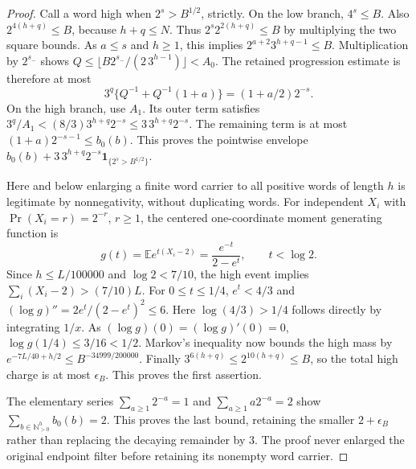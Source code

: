 \documentclass[11pt]{article}
\theoremstyle{remark}\newtheorem{remark}[proposition]{Remark}
\begin{document}
\begin{proof}
Call a word high when $2^s>B^{1/2}$, strictly. On the low branch,
$4^s\le B$. Also $2^{4(h+q)}\le B$, because $h+q\le N$.
Thus $2^s2^{2(h+q)}\le B$ by multiplying the two square bounds.
As $a\le s$ and $h\ge1$, this implies
$2^{a+2}3^{h+q-1}\le B$. Multiplication by $2^{s_-}$ shows
$Q\le\lfloor B2^{s_-}/(2\,3^{h-1})\rfloor<A_0$.
The retained progression estimate is therefore at most
\[
 3^q\{Q^{-1}+Q^{-1}(1+a)\}=(1+a/2)2^{-s}.
\]
On the high branch, use $A_1$. Its outer term satisfies
$3^q/A_1<(8/3)3^{h+q}2^{-s}\le3\,3^{h+q}2^{-s}$.
The remaining term is at most $(1+a)2^{-s-1}\le b_0(b)$.
This proves the pointwise envelope
$b_0(b)+3\,3^{h+q}2^{-s}\mathbf1_{\{2^s>B^{1/2}\}}$.

Here and below enlarging a finite word carrier to all positive words
of length $h$ is legitimate by nonnegativity, without duplicating words.
For independent $X_i$ with $\Pr(X_i=r)=2^{-r}$, $r\ge1$, the centered
one-coordinate moment generating function is
\[
 g(t)=\mathbb E e^{t(X_i-2)}
     =\frac{e^{-t}}{2-e^t},\qquad t<\log2.
\]
Since $h\le L/100000$ and $\log2<7/10$, the high event implies
$\sum_i(X_i-2)>(7/10)L$.
For $0\le t\le1/4$, $e^t<4/3$ and
$(\log g)''=2e^t/(2-e^t)^2\le6$.
Here $\log(4/3)>1/4$ follows directly by integrating $1/x$.
As $(\log g)(0)=(\log g)'(0)=0$, $\log g(1/4)\le3/16<1/2$.
Markov's inequality now bounds the high mass by
$e^{-7L/40+h/2}\le B^{-34999/200000}$.
Finally $3^{6(h+q)}\le2^{10(h+q)}\le B$, so the total high charge
is at most $\epsilon_B$. This proves the first assertion.

The elementary series $\sum_{a\ge1}2^{-a}=1$ and
$\sum_{a\ge1}a2^{-a}=2$ show
$\sum_{b\in\mathbb N_{>0}^h}b_0(b)=2$.
This proves the last bound, retaining the smaller $2+\epsilon_B$
rather than replacing the decaying remainder by $3$.
The proof never enlarged the original endpoint filter before retaining
its nonempty word carrier.
\end{proof}
\end{document}
